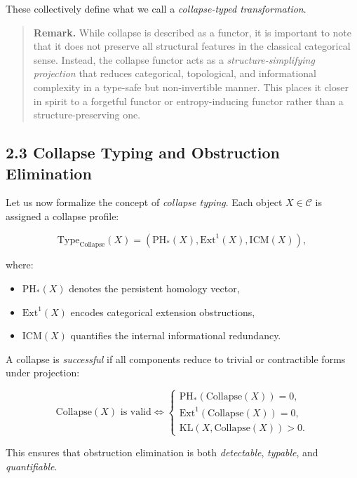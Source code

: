 \documentclass[11pt]{article}
\begin{document}
These collectively define what we call a \textit{collapse-typed transformation}.

\begin{quote}
\textbf{Remark.} While collapse is described as a functor, it is important to note that it does not preserve all structural features in the classical categorical sense. Instead, the collapse functor acts as a \emph{structure-simplifying projection} that reduces categorical, topological, and informational complexity in a type-safe but non-invertible manner. This places it closer in spirit to a forgetful functor or entropy-inducing functor rather than a structure-preserving one.
\end{quote}


\subsection*{2.3 Collapse Typing and Obstruction Elimination}

Let us now formalize the concept of \textit{collapse typing}. Each object \( X \in \mathcal{C} \) is assigned a collapse profile:

\[
\mathrm{Type}_{\mathrm{Collapse}}(X) = 
\left( \mathrm{PH}_*(X), \mathrm{Ext}^1(X), \mathrm{ICM}(X) \right),
\]

where:

\begin{itemize}
    \item \( \mathrm{PH}_*(X) \) denotes the persistent homology vector,
    \item \( \mathrm{Ext}^1(X) \) encodes categorical extension obstructions,
    \item \( \mathrm{ICM}(X) \) quantifies the internal informational redundancy.
\end{itemize}

A collapse is \textit{successful} if all components reduce to trivial or contractible forms under projection:

\[
\mathrm{Collapse}(X) \text{ is valid} \iff
\begin{cases}
\mathrm{PH}_*(\mathrm{Collapse}(X)) = 0, \\
\mathrm{Ext}^1(\mathrm{Collapse}(X)) = 0, \\
\mathrm{KL}(X, \mathrm{Collapse}(X)) > 0.
\end{cases}
\]

This ensures that obstruction elimination is both \textit{detectable}, \textit{typable}, and \textit{quantifiable}.
\end{document}
